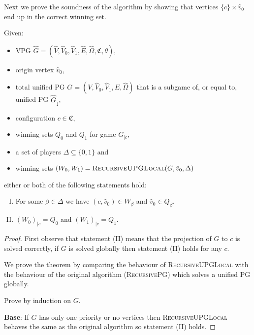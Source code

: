Next we prove the soundness of the algorithm by showing that vertices $\{c\} \times \hat{v}_0$ end up in the correct winning set.
\begin{theorem}
	Given:
	\begin{itemize}
		\item VPG $\hat{G} = (\hat{V}, \hat{V}_0,\hat{V}_1,\hat{E},\hat{\Omega},\mathfrak{C},\theta)$,
		\item origin vertex $\hat{v}_0$,
		\item total unified PG $G = (V, \hat{V}_0, \hat{V}_1,E,\hat{\Omega})$ that is a subgame of, or equal to, unified PG $\hat{G}_{\downarrow}$,
		\item configuration $c\in \mathfrak{C}$,
		\item winning sets $Q_0$ and $Q_1$ for game $G_{|c}$,
		\item a set of players $\Delta \subseteq \{0,1\}$ and
		\item winning sets $(W_0, W_1) = \textsc{RecursiveUPGLocal}(G,\hat{v}_0,\Delta)$
	\end{itemize}
either or both of the following statements hold:
	\begin{enumerate}[(I)]
		\item For some $\beta \in \Delta$ we have $(c,\hat{v}_0) \in W_\beta$ and $\hat{v}_0 \in Q_\beta$.
		\item $(W_0)_{|c} = Q_0$ and $(W_1)_{|c} = Q_1$.
	\end{enumerate}
\begin{proof}
	First observe that statement (II) means that the projection of $G$ to $c$ is solved correctly, if $G$ is solved globally then statement (II) holds for any $c$.
	
	We prove the theorem by comparing the behaviour of \textsc{RecursiveUPGLocal} with the behaviour of the original algorithm (\textsc{RecursivePG}) which solves a unified PG globally.
	
	Prove by induction on $G$.
	
	\textbf{Base}: If $G$ has only one priority or no vertices then \textsc{RecursiveUPGLocal} behaves the same as the original algorithm so statement (II) holds.


\end{proof}
\end{theorem}
